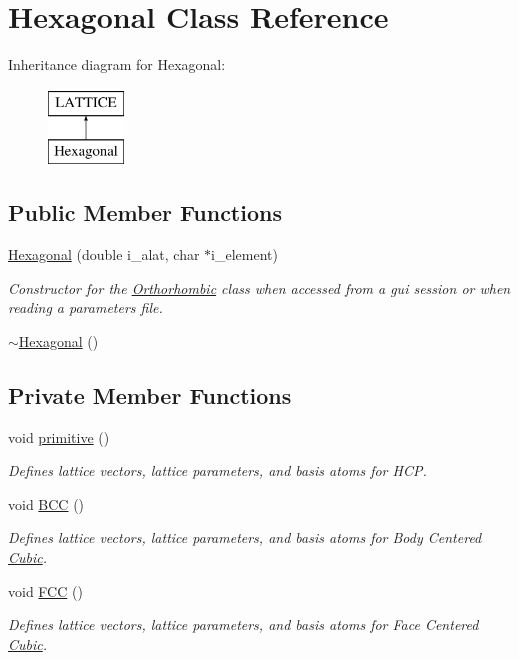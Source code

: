 \hypertarget{class_hexagonal}{}\section{Hexagonal Class Reference}
\label{class_hexagonal}
Inheritance diagram for Hexagonal\+:\begin{figure}[H]
\begin{center}
\leavevmode
\includegraphics[height=2.000000cm]{class_hexagonal}
\end{center}
\end{figure}
\subsection*{Public Member Functions}
\begin{DoxyCompactItemize}
\item 
\hyperlink{class_hexagonal_adc3a73cb01ce229bfec31bb3a284a75b}{Hexagonal} (double i\+\_\+alat, char $\ast$i\+\_\+element)
\begin{DoxyCompactList}\small\item\em Constructor for the \hyperlink{class_orthorhombic}{Orthorhombic} class when accessed from a gui session or when reading a parameters file. \end{DoxyCompactList}\item 
\hyperlink{class_hexagonal_a972f325f1676b0bd7021c7d61b43311c}{$\sim$\+Hexagonal} ()
\end{DoxyCompactItemize}
\subsection*{Private Member Functions}
\begin{DoxyCompactItemize}
\item 
void \hyperlink{class_hexagonal_ae3e49df1849db3e8d865b5590cdfe18a}{primitive} ()
\begin{DoxyCompactList}\small\item\em Defines lattice vectors, lattice parameters, and basis atoms for H\+C\+P. \end{DoxyCompactList}\item 
void \hyperlink{class_hexagonal_af839a9f7a90a1d29bf972b45447eb4e0}{B\+C\+C} ()
\begin{DoxyCompactList}\small\item\em Defines lattice vectors, lattice parameters, and basis atoms for Body Centered \hyperlink{class_cubic}{Cubic}. \end{DoxyCompactList}\item 
void \hyperlink{class_hexagonal_adb86bd086e5ee120214a2bf246f96c16}{F\+C\+C} ()
\begin{DoxyCompactList}\small\item\em Defines lattice vectors, lattice parameters, and basis atoms for Face Centered \hyperlink{class_cubic}{Cubic}. \end{DoxyCompactList}\end{DoxyCompactItemize}
